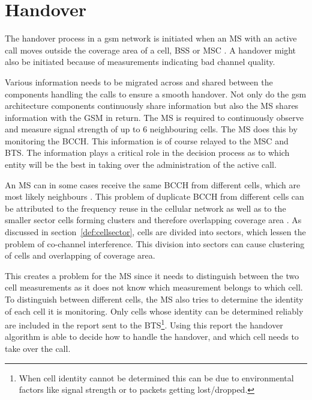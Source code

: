 \section{Handover}
\label{sec:handover}
The handover process in a \gls{gsm} network is initiated when an \gls{MS} with an active call moves outside the coverage area of a cell, \gls{BSS} or \gls{MSC} \cite{GSMArchitectureProtocolsServices,wirelesstelcoMullet,Eisenblatter}. A handover might also be initiated because of measurements indicating bad channel quality\cite{GSMArchitectureProtocolsServices}. 

Various information needs to be migrated across and shared between the components handling the calls to ensure a smooth handover. Not only do the \gls{gsm} architecture components continuously share information but also the \gls{MS} shares information with the GSM in return\@. The \gls{MS} is required to continuously observe and measure signal strength of up to 6 neighbouring cells. The \gls{MS} does this by monitoring the \gls{BCCH}\cite{GSMArchitectureProtocolsServices,wirelesstelcoMullet}. This information is of course relayed to the \gls{MSC} and \gls{BTS}. The information plays a critical role in the decision process as to which entity will be the best in taking over the administration of the active call\cite{GSMArchitectureProtocolsServices,wirelesstelcoMullet}.

An \gls{MS} can in some cases receive the same \gls{BCCH} from different cells, which are most likely neighbours \cite{GSMArchitectureProtocolsServices}. This problem of duplicate \gls{BCCH} from different cells can be attributed to the frequency reuse in the cellular network as well as to the smaller sector cells forming clusters and therefore overlapping coverage area \cite{GSMArchitectureProtocolsServices}. As discussed in section~\ref{def:cellsector}, cells are divided into sectors, which lessen the problem of co-channel interference. This division into sectors can cause clustering of cells and overlapping of coverage area.

This creates a problem for the \gls{MS} since it needs to distinguish between the two cell measurements as it does not know which measurement belongs to which cell\cite{GSMArchitectureProtocolsServices}. To distinguish between different cells, the \gls{MS} also tries to determine the identity of each cell it is monitoring. Only cells whose identity can be determined reliably are included in the report sent to the BTS\cite{Eisenblatter,GSMArchitectureProtocolsServices,wirelesstelcoMullet}\footnote{When cell identity cannot be determined this can be due to environmental factors like signal strength or to packets getting lost/dropped.}. Using this report the handover algorithm is able to decide how to handle the handover, and which cell needs to take over the call\cite{Eisenblatter,GSMArchitectureProtocolsServices,wirelesstelcoMullet}.

